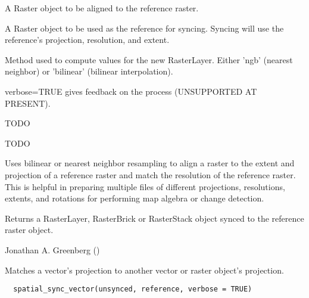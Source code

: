 \documentclass[a4paper]{book}
\begin{document}
%
\begin{Arguments}
\begin{ldescription}
\item[\code{unsynced}] A Raster object to be aligned to the
reference raster.

\item[\code{reference}] A Raster object to be used as the
reference for syncing. Syncing will use the reference's
projection, resolution, and extent.

\item[\code{method}] Method used to compute values for the new
RasterLayer. Either 'ngb' (nearest neighbor) or
'bilinear' (bilinear interpolation).

\item[\code{verbose}] verbose=TRUE gives feedback on the process
(UNSUPPORTED AT PRESENT).

\item[\code{size\_only}] TODO

\item[\code{raster\_size}] TODO
\end{ldescription}
\end{Arguments}
%
\begin{Details}\relax
Uses bilinear or nearest neighbor resampling to align a
raster to the extent and projection of a reference raster
and match the resolution of the reference raster.  This
is helpful in preparing multiple files of different
projections, resolutions, extents, and rotations for
performing map algebra or change detection.
\end{Details}
%
\begin{Value}
Returns a RasterLayer, RasterBrick or RasterStack object
synced to the reference raster object.
\end{Value}
%
\begin{Author}\relax
Jonathan A. Greenberg
()
\end{Author}
%
\begin{Description}\relax
Matches a vector's projection to another vector or raster
object's projection.
\end{Description}
%
\begin{Usage}
\begin{verbatim}
  spatial_sync_vector(unsynced, reference, verbose = TRUE)
\end{verbatim}
\end{Usage}
\end{document}
